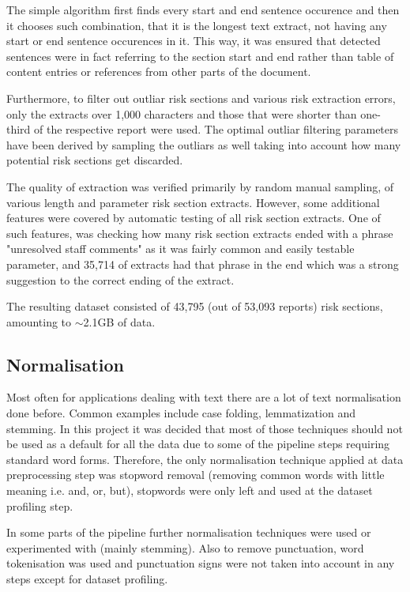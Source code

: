The simple algorithm first finds every start and end sentence occurence and then it chooses such combination, that it is the longest text extract, not having any start or end sentence occurences in it. This way, it was ensured that detected sentences were in fact referring to the section start and end rather than table of content entries or references from other parts of the document.

Furthermore, to filter out outliar risk sections and various risk extraction errors, only the extracts over 1,000 characters and those that were shorter than one-third of the respective report were used. The optimal outliar filtering parameters have been derived by sampling the outliars as well taking into account how many potential risk sections get discarded.

The quality of extraction was verified primarily by random manual sampling, of various length and parameter risk section extracts. However, some additional features were covered by automatic testing of all risk section extracts. One of such features, was checking how many risk section extracts ended with a phrase "unresolved staff comments" as it was fairly common and easily testable parameter, and 35,714 of extracts had that phrase in the end which was a strong suggestion to the correct ending of the extract.

The resulting dataset consisted of 43,795 (out of 53,093 reports) risk sections, amounting to $\sim$2.1GB of data.

\subsection{Normalisation}
Most often for applications dealing with text there are a lot of text normalisation done before. Common examples include case folding, lemmatization and stemming. In this project it was decided that most of those techniques should not be used as a default for all the data due to some of the pipeline steps requiring standard word forms. Therefore, the only normalisation technique applied at data preprocessing step was stopword removal (removing common words with little meaning i.e. and, or, but), stopwords were only left and used at the dataset profiling step.

In some parts of the pipeline further normalisation techniques were used or experimented with (mainly stemming). Also to remove punctuation, word tokenisation was used and punctuation signs were not taken into account in any steps except for dataset profiling.


